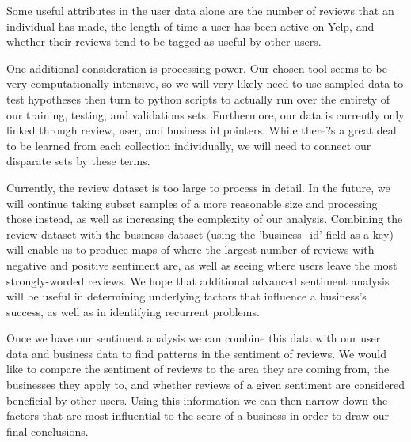 \quad Some useful attributes in the user data alone are the number of reviews that an individual has made, the length of time a user has been active on Yelp, and whether their reviews tend to be tagged as useful by other users. 

\quad One additional consideration is processing power. Our chosen tool seems to be very computationally intensive, so we will very likely need to use sampled data to test hypotheses then turn to python scripts to actually run over the entirety of our training, testing, and validations sets. Furthermore, our data is currently only linked through review, user, and business id pointers. While there?s a great deal to be learned from each collection individually, we will need to connect our disparate sets by these terms. 

\quad Currently, the review dataset is too large to process in detail. In the future, we will continue taking subset samples of a more reasonable size and processing those instead, as well as increasing the complexity of our analysis. Combining the review dataset with the business dataset (using the 'business\_id' field as a key) will enable us to produce maps of where the largest number of reviews with negative and positive sentiment are, as well as seeing where users leave the most strongly-worded reviews. We hope that additional advanced sentiment analysis will be useful in determining underlying factors that influence a business's success, as well as in identifying recurrent problems.

\quad Once we have our sentiment analysis we can combine this data with our user data and business data to find patterns in the sentiment of reviews. We would like to compare the sentiment of reviews to the area they are coming from, the businesses they apply to, and whether reviews of a given sentiment are considered beneficial by other users. Using this information we can then narrow down the factors that are most influential to the score of a business in order to draw our final conclusions.



